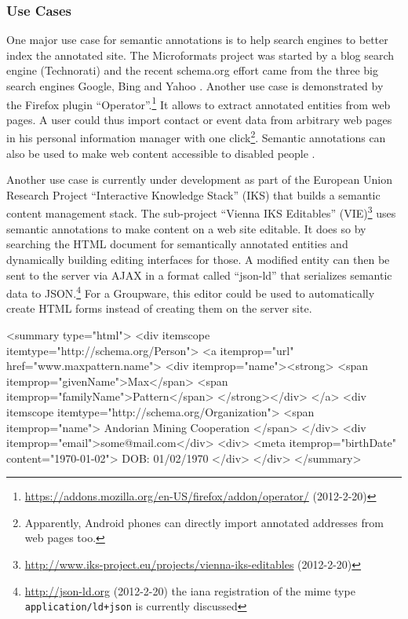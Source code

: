 \documentclass[11pt,a4paper,headsepline,twoside]{scrartcl}		%
\newcommand{\citeurl}[2]{\url{#1} (#2)}
\begin{document}
\subsubsection{Use Cases}
\label{sec:semantic-anno-use-cases}

One major use case for semantic annotations is to help search engines to better
index the annotated site. The Microformats project was started by a blog search
engine (Technorati) \cite{Celik2006} and the recent schema.org effort came from
the three big search engines Google, Bing and Yahoo \cite{Goel2011}. Another use
case is demonstrated by the Firefox plugin
``Operator''.\footnote{\citeurl{https://addons.mozilla.org/en-US/firefox/addon/operator/}{2012-2-20}}
It allows to extract annotated entities from web pages. A user could thus import
contact or event data from arbitrary web pages in his personal information
manager with one click\footnote{Apparently, Android phones can directly import
  annotated addresses from web pages too.}. Semantic annotations can also be
used to make web content accessible to disabled
people \cite{Yesilada:2007:EDS:1279700.1279704}.

Another use case is currently under development as part of the European Union
Research Project ``Interactive Knowledge Stack'' (IKS) that builds a semantic
content management stack. The sub-project ``Vienna IKS Editables''
(VIE)\footnote{\citeurl{http://www.iks-project.eu/projects/vienna-iks-editables}{2012-2-20}}
uses semantic annotations to make content on a web site editable. It does so by
searching the HTML document for semantically annotated entities and dynamically
building editing interfaces for those. A modified entity can then be sent to the
server via AJAX in a format called ``json-ld'' that serializes semantic data to
JSON.\footnote{\citeurl{http://json-ld.org}{2012-2-20} the iana registration of
  the mime type \lstinline:application/ld+json: is currently discussed} For a
Groupware, this editor could be used to automatically create HTML forms instead
of creating them on the server site.

\begin{anylisting}[label=fig:microdata-atom-summary,
                   language=xml,
                   caption={Microdata used in the summary of an ATOM entry summary (markup not escaped for clarity)}]
<summary type="html">
  <div itemscope itemtype="http://schema.org/Person">
    <a itemprop="url" href="www.maxpattern.name">
      <div itemprop="name"><strong>
        <span itemprop="givenName">Max</span>
        <span itemprop="familyName">Pattern</span>
      </strong></div>
    </a>
    <div itemscope
         itemtype="http://schema.org/Organization">
      <span itemprop="name">
        Andorian Mining Cooperation
      </span>
    </div>
    <div itemprop="email">some@mail.com</div>
    <div>
      <meta itemprop="birthDate" content="1970-01-02">
      DOB: 01/02/1970
    </div>
  </div>
</summary>  
\end{anylisting}
\end{document}
